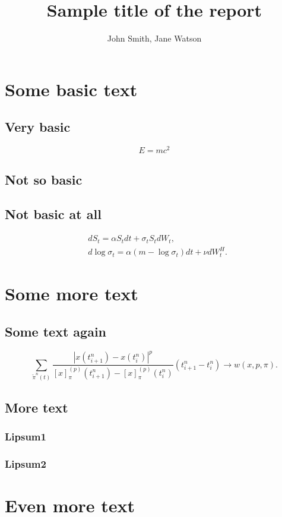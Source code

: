 \documentclass[
    ]{vegareport}
\title{Sample title of the report}
\author{John Smith, Jane Watson}
\date{}
\begin{document}
    \maketitle
    
    \introduction
        \lipsum[1-3]
        \cite{Black1976}
 
    \chapter{Some basic text}
        \section{Very basic}
            \lipsum[4]
            \begin{equation}
                E = mc^2
            \end{equation}
        \section{Not so basic}
            \lipsum[5-7]
        \section{Not basic at all}
            \begin{align}
                & dS_t          = \alpha S_t dt + \sigma_t S_tdW_t,               \label{model:RFSVasset} \\
                & d\log\sigma_t = \alpha (m - \log\sigma_t) dt + \nu dW_t^H.      \label{model:RFSVvol}
            \end{align}
            \lipsum*[2-4]

    \chapter{Some more text}
        \section{Some text again}
            \lipsum[8-11]
            \begin{equation}
                \sum_{\tilde\pi^n(t)}\frac{\left|x(t_{i+1}^n) - x(t_i^n)\right|^p}{\left[x\right]_{\pi}^{(p)}(t_{i+1}^n)-\left[x\right]_{\pi}^{(p)}(t_i^n)} (t_{i+1}^n-t_{i}^n) \to w(x, p, \pi).
            \end{equation}
        \section{More text}
            \subsection{Lipsum1}
                \lipsum[12-13]
            \subsection{Lipsum2}
        

    \chapter{Even more text}
        \lipsum[17-25]

    \conclusion
        \lipsum[26-30]

\end{document}

